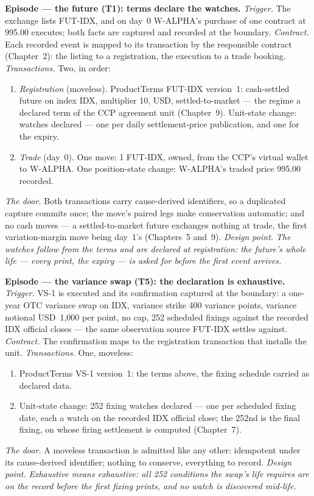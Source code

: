 \documentclass[11pt,a4paper]{article}
\newcommand{\USD}[1]{\mbox{USD~#1}}
\begin{document}
\medskip\noindent\textbf{Episode --- the future (T1): terms declare the watches.}
\emph{Trigger.} The exchange lists FUT-IDX, and on day~0 W-ALPHA's purchase of one
contract at 995.00 executes; both facts are captured and recorded at the boundary.
\emph{Contract.} Each recorded event is mapped to its transaction by the responsible
contract (Chapter~2): the listing to a registration, the execution to a trade booking.
\emph{Transactions.} Two, in order:
\begin{enumerate}[nosep,leftmargin=2.2em]
\item \emph{Registration} (moveless). ProductTerms FUT-IDX version~1: cash-settled
  future on index IDX, multiplier 10, USD, settled-to-market --- the regime a declared
  term of the CCP agreement unit (Chapter~9). Unit-state change: watches declared ---
  one per daily settlement-price publication, and one for the expiry.
\item \emph{Trade} (day~0). One move: 1 FUT-IDX, owned, from the CCP's virtual wallet to
  W-ALPHA. One position-state change: W-ALPHA's traded price 995.00 recorded.
\end{enumerate}
\emph{The door.} Both transactions carry cause-derived identifiers, so a duplicated
capture commits once; the move's paired legs make conservation automatic; and no cash
moves --- a settled-to-market future exchanges nothing at trade, the first
variation-margin move being day~1's (Chapters~5 and~9).
\emph{Design point.} \emph{The watches follow from the terms and are declared at
registration: the future's whole life --- every print, the expiry --- is asked for
before the first event arrives.}

\medskip\noindent\textbf{Episode --- the variance swap (T5): the declaration is
exhaustive.}
\emph{Trigger.} VS-1 is executed and its confirmation captured at the boundary: a
one-year OTC variance swap on IDX, variance strike 400 variance points, variance
notional \USD{1{,}000} per point, no cap, 252 scheduled fixings against the recorded IDX
official closes --- the same observation source FUT-IDX settles against.
\emph{Contract.} The confirmation maps to the registration transaction that installs the
unit.
\emph{Transactions.} One, moveless:
\begin{enumerate}[nosep,leftmargin=2.2em]
\item ProductTerms VS-1 version~1: the terms above, the fixing schedule carried as
  declared data.
\item Unit-state change: 252 fixing watches declared --- one per scheduled fixing date,
  each a watch on the recorded IDX official close; the 252nd is the final fixing, on
  whose firing settlement is computed (Chapter~7).
\end{enumerate}
\emph{The door.} A moveless transaction is admitted like any other: idempotent under its
cause-derived identifier; nothing to conserve, everything to record.
\emph{Design point.} \emph{Exhaustive means exhaustive: all 252 conditions the swap's
life requires are on the record before the first fixing prints, and no watch is
discovered mid-life.}
\end{document}
